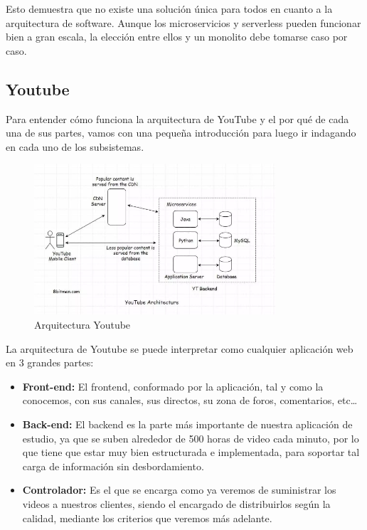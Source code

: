 \documentclass[12pt,a4paper]{article}
\begin{document}
    Esto demuestra que no existe una solución única para todos en cuanto a la arquitectura de software. Aunque los microservicios y serverless pueden funcionar bien a gran escala, la elección entre ellos y un monolito debe tomarse caso por caso.


    \newpage
    
    \subsection{Youtube}

    Para entender cómo funciona la arquitectura de YouTube y el por qué de cada una de sus partes, vamos con una pequeña introducción para luego ir indagando en cada uno de los subsistemas.

    \begin{figure}[H]
        \centering
        \includegraphics[width=0.8\textwidth]{./img/arquitectura_youtube.png}
        \caption{Arquitectura Youtube}
        \label{fig:arquitectura_youtube}
    \end{figure}

    La arquitectura de Youtube se puede interpretar como cualquier aplicación web en 3 grandes partes:

    \begin{itemize}
        \item \textbf{Front-end:} El frontend, conformado por la aplicación, tal y como la conocemos, con sus canales, sus directos, su zona de foros, comentarios, etc…
        \item \textbf{Back-end:} El backend es la parte más importante de nuestra aplicación de estudio, ya que se suben alrededor de 500 horas de video cada minuto, por lo que tiene que estar muy bien estructurada e implementada, para soportar tal carga de información sin desbordamiento. 
        \item \textbf{Controlador:} Es el que se encarga como ya veremos de suministrar los videos a nuestros clientes, siendo el encargado de distribuirlos según la calidad, mediante los criterios que veremos más adelante. 
    \end{itemize}
\end{document}
